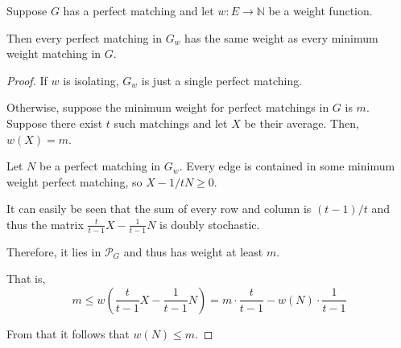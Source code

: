 \documentclass{beamer}
\theoremstyle{remark}
\newcommand{\nn}{\mathbb{N}}
\newcommand{\pmatch}{\mathcal{P}}
\begin{document}
\begin{frame}[allowframebreaks]
  \begin{lemma}
    Suppose $G$ has a perfect matching and let
    $w : E \to \nn$ be a weight function.

    Then every perfect matching in $G_w$ has the same weight
    as every minimum weight matching in $G$.
  \end{lemma}

  \begin{proof}
    If $w$ is isolating, $G_w$ is just a single perfect matching.

    Otherwise, suppose the minimum weight for perfect matchings in $G$
    is $m$. Suppose there exist $t$ such matchings and let
    $X$ be their average. Then, $w(X) = m$.

    Let $N$ be a perfect matching in $G_w$.
    Every edge is contained in some minimum weight perfect matching,
    so $X - 1/t N \ge 0$.

    It can easily be seen that the sum of every row and column
    is $(t-1)/t$ and thus the matrix $\frac{t}{t-1} X - \frac{1}{t-1}N$ is
    doubly stochastic.

    Therefore, it lies in $\pmatch_G$ and thus has weight at least $m$.

    That is, \[
      m \le w\left(\frac{t}{t-1} X - \frac{1}{t-1}N\right) =
      m \cdot \frac{t}{t-1} - w(N) \cdot \frac{1}{t-1}
    \]

    From that it follows that $w(N) \le m$.
  \end{proof}
\end{frame}
\end{document}
